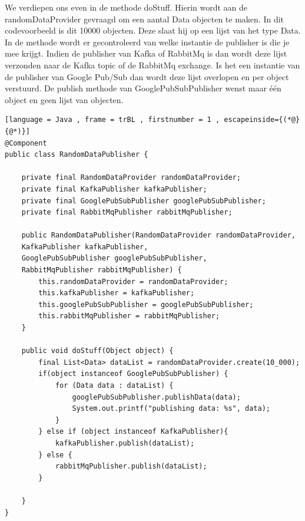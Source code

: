 We verdiepen ons even in de methode doStuff. Hierin wordt aan de randomDataProvider gevraagd om een aantal Data objecten te maken. In dit codevoorbeeld is dit 10000 objecten. Deze slaat hij op een lijst van het type Data. In de methode wordt er gecontroleerd van welke instantie de publisher is die je mee krijgt. Indien de publisher van Kafka of RabbitMq is dan wordt deze lijst verzonden naar de Kafka topic of de RabbitMq exchange. Is het een instantie van de publisher van Google Pub/Sub dan wordt deze lijst overlopen en per object verstuurd. De publish methode van GooglePubSubPublisher wenst maar één object en geen lijst van objecten.

\begin{lstlisting}[language = Java , frame = trBL , firstnumber = 1 , escapeinside={(*@}{@*)}]
@Component
public class RandomDataPublisher {
    
    private final RandomDataProvider randomDataProvider;
    private final KafkaPublisher kafkaPublisher;
    private final GooglePubSubPublisher googlePubSubPublisher;
    private final RabbitMqPublisher rabbitMqPublisher;
    
    public RandomDataPublisher(RandomDataProvider randomDataProvider,
    KafkaPublisher kafkaPublisher,
    GooglePubSubPublisher googlePubSubPublisher,
    RabbitMqPublisher rabbitMqPublisher) {
        this.randomDataProvider = randomDataProvider;
        this.kafkaPublisher = kafkaPublisher;
        this.googlePubSubPublisher = googlePubSubPublisher;
        this.rabbitMqPublisher = rabbitMqPublisher;
    }
    
    public void doStuff(Object object) {
        final List<Data> dataList = randomDataProvider.create(10_000);
        if(object instanceof GooglePubSubPublisher) {
            for (Data data : dataList) {
                googlePubSubPublisher.publishData(data);
                System.out.printf("publishing data: %s", data);
            }
        } else if (object instanceof KafkaPublisher){
            kafkaPublisher.publish(dataList);
        } else {
            rabbitMqPublisher.publish(dataList);
        }
        
    }
}
\end{lstlisting}

